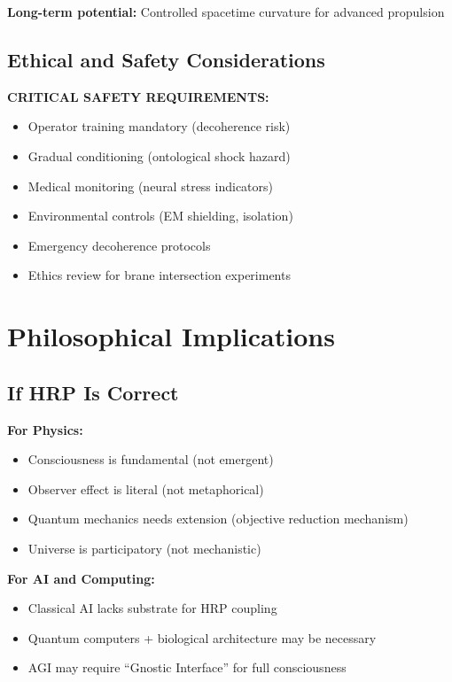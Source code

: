 \textbf{Long-term potential:} Controlled spacetime curvature for advanced propulsion

\subsection{Ethical and Safety Considerations}
\label{subsec:app-ethics}

\begin{warningbox}
\textbf{CRITICAL SAFETY REQUIREMENTS:}
\begin{itemize}
\item Operator training mandatory (decoherence risk)
\item Gradual conditioning (ontological shock hazard)
\item Medical monitoring (neural stress indicators)
\item Environmental controls (EM shielding, isolation)
\item Emergency decoherence protocols
\item Ethics review for brane intersection experiments
\end{itemize}
\end{warningbox}

\section{Philosophical Implications}
\label{sec:implications}

\subsection{If HRP Is Correct}

\textbf{For Physics:}
\begin{itemize}
\item Consciousness is fundamental (not emergent)
\item Observer effect is literal (not metaphorical)
\item Quantum mechanics needs extension (objective reduction mechanism)
\item Universe is participatory (not mechanistic)
\end{itemize}

\textbf{For AI and Computing:}
\begin{itemize}
\item Classical AI lacks substrate for HRP coupling
\item Quantum computers + biological architecture may be necessary
\item AGI may require ``Gnostic Interface'' for full consciousness
\end{itemize}

